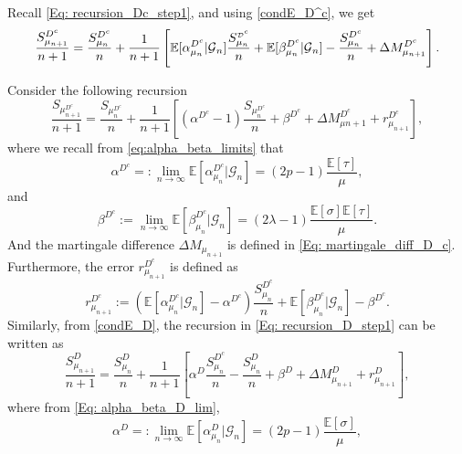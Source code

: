 \documentclass{article}
\numberwithin{equation}{section}
\newcommand{\GG}{\mbox{${\mathcal G}$}}
\newcommand{\sDD}{\tiny{\mbox{${\mathcal D}$}}}
\newcommand{\1}{\mathbf{1}}
\newcommand{\0}{\mathbf{0}}
\newcommand{\E}{\mbox{${\mathbb E}$}}
\begin{document}
Recall \eqref{Eq: recursion_Dc_step1}, and using \eqref{condE_D^c}, we get 
\begin{equation*}
\label{Eq: recursion_Dc_step2}
\frac{S^{D^c}_{\mu_{n+1}}}{n+1}= \frac{S^{D^c}_{\mu_{n}}}{n}+\frac{1}{n+1} \left[\E[\alpha_{\mu_n}^{D^c} \vert \GG_n] \frac{S_{\mu_n}^{\sDD^c}}{n} + \E[\beta_{\mu_n}^{D^c} \vert \GG_n]-\frac{S^{D^c}_{\mu_{n}}}{n}+ \Delta M_{\mu_{n+1}}^{D^c} \right].
\end{equation*}

Consider the following recursion
\begin{equation}
\label{Eq: recursion_bdd_time_D_c_right_normalisation}
\frac{S_{\mu_{n+1}^{D^c}}}{n+1}= \frac{S_{\mu_{n}^{D^c}}}{n}+ \frac{1}{n+1} \left[(\alpha^{D^c}-1)\frac{S_{\mu_{n}^{D^c}}}{n}+\beta^{D^c}+ \Delta M_{\mu{n+1}}^{D^c}+r_{\mu_{n+1}}^{D^c}\right],
\end{equation} 
where we recall from \eqref{eq:alpha_beta_limits} that
\begin{equation*}
\label{Eq:alpha_D_c_bounded_times_right_normalisation}
\alpha^{D^c}=:\lim_{n \to \infty} \mathbb{E}\left[\alpha_{\mu_n}^{D^c}| \GG_{n}\right]= (2p-1)\frac{\E \left[\tau\right]}{\mu},
\end{equation*}
and  
\begin{equation*}
\label{Eq:beta_D_c_bounded_times_right_normalisation}
\beta^{D^c}:=\lim_{n \to \infty}\E[\beta_{\mu_n}^{D^c} \vert \GG_{n}]=(2 \lambda -1) \frac{\E [\sigma] \E[\tau]}{\mu}.
\end{equation*}
And the martingale difference $\Delta M_{\mu_{n+1}}$ is defined in \eqref{Eq: martingale_diff_D_c}. Furthermore, 
the error $r_{\mu_{n+1}}^{D^c}$ is defined as 
\begin{equation}
\label{Eq: error_D_c_mu_n}
r_{\mu_{n+1}}^{D^c}:= \left(\E \left[\alpha_{\mu_n}^{D^c} | \GG_{n} \right]-\alpha^{D^c}\right)\frac{S_{\mu_n}^{D^c}}{n}+ \E \left[\beta_{\mu_n}^{D^c}| \GG_{n}\right]- \beta^{{D^c}}.
\end{equation}
Similarly, from \eqref{condE_D}, the recursion in \eqref{Eq: recursion_D_step1} can be written as 
\begin{equation}
\label{Eq: recursion_bdd_time_D_right_normalisation}
\frac{S_{\mu_{n+1}}^{D}}{n+1}= \frac{S_{\mu_{n}}^{D}}{n}+ \frac{1}{n+1} \left[\alpha^{D}\frac{S_{\mu_{n}}^{D^c}}{n} - \frac{S_{\mu_{n}}^{D}}{n}+\beta^{D}+ \Delta M_{\mu_{n+1}}^{D}+r_{\mu_{n+1}}^{D}\right],
\end{equation}
where from \eqref{Eq: alpha_beta_D_lim},
\begin{equation*}
\label{Eq:alpha_D_bounded_times_right_normalisation}
\alpha^{D}=:\lim_{n \to \infty} \mathbb{E}\left[\alpha_{\mu_n}^{D}| \GG_{n}\right]=(2p-1)\frac{\mathbb{E}[\sigma]}{\mu},
\end{equation*}
\end{document}

